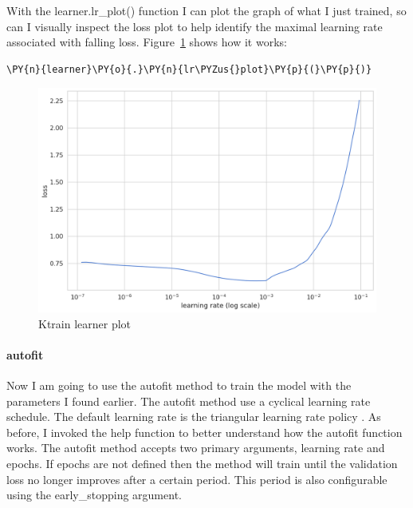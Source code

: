 With the learner.lr\_plot() function I can plot the graph of what I just trained, so can I visually inspect the loss plot to help identify the maximal learning rate associated with falling loss.
Figure~\ref{fig:fig_08} shows how it works:
 \begin{tcolorbox}[breakable, size=fbox, boxrule=1pt, pad at break*=1mm,colback=cellbackground, colframe=cellborder]
\begin{Verbatim}[commandchars=\\\{\},fontsize=\footnotesize]
\PY{n}{learner}\PY{o}{.}\PY{n}{lr\PYZus{}plot}\PY{p}{(}\PY{p}{)}
\end{Verbatim}
\end{tcolorbox}

\begin{figure}[ht!]
\centering
\includegraphics[width=1\textwidth]{images/output_118_1.png}
\caption{Ktrain learner plot}
\label{fig:fig_08}
\end{figure}
\FloatBarrier

\paragraph{autofit}
Now I am going to use the autofit \cite{noauthor_amaiyaktrainautofit_nodate} method to train the model with the parameters I found earlier.
The autofit method use a cyclical learning rate schedule. The default learning rate is the triangular learning rate policy \cite{smith_cyclical_2017}.
As before, I invoked the help function to better understand how the autofit function works.
The autofit method accepts two primary arguments, learning rate and epochs.
If epochs are not defined then the method will train until the validation loss no longer improves after a certain period. This period is also configurable using the early\_stopping argument. 

